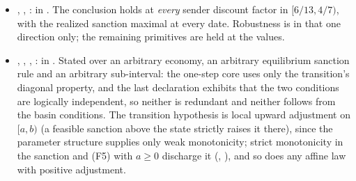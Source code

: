 \begin{itemize}[leftmargin=1.4em,itemsep=1pt]
\item {},
, :
 in
.  The conclusion holds
at \emph{every} sender discount factor in $[6/13,4/7)$, with the realized
sanction maximal at every date.  Robustness is in that one direction only; the
remaining primitives are held at the  values.
\item {},
,
, :
 in
.  Stated over an arbitrary
economy, an arbitrary equilibrium sanction rule and an arbitrary sub-interval:
the one-step core uses only the transition's diagonal property, and the last
declaration exhibits that the two conditions are logically independent, so
neither is redundant and neither follows from the basin conditions.  The
transition hypothesis is local upward adjustment on $[a,b)$ (a feasible
sanction above the state strictly raises it there), since the
parameter structure supplies only weak monotonicity; strict monotonicity in the
sanction and (F5) with $a\ge0$ discharge it
(,
),
and so does any affine law with positive adjustment.
\end{itemize}



